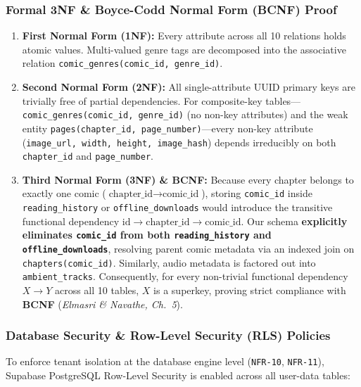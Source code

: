 \subsubsection{Formal 3NF \& Boyce-Codd Normal Form (BCNF) Proof}
\begin{enumerate}
    \item \textbf{First Normal Form (1NF):} Every attribute across all 10 relations holds atomic values. Multi-valued genre tags are decomposed into the associative relation \texttt{comic\_genres(comic\_id, genre\_id)}.
    \item \textbf{Second Normal Form (2NF):} All single-attribute UUID primary keys are trivially free of partial dependencies. For composite-key tables---\texttt{comic\_genres(comic\_id, genre\_id)} (no non-key attributes) and the weak entity \texttt{pages(chapter\_id, page\_number)}---every non-key attribute (\texttt{image\_url, width, height, image\_hash}) depends irreducibly on both \texttt{chapter\_id} and \texttt{page\_number}.
    \item \textbf{Third Normal Form (3NF) \& BCNF:} Because every chapter belongs to exactly one comic ($\text{chapter\_id} \to \text{comic\_id}$), storing \texttt{comic\_id} inside \texttt{reading\_history} or \texttt{offline\_downloads} would introduce the transitive functional dependency $\text{id} \to \text{chapter\_id} \to \text{comic\_id}$. Our schema \textbf{explicitly eliminates \texttt{comic\_id} from both \texttt{reading\_history} and \texttt{offline\_downloads}}, resolving parent comic metadata via an indexed join on \texttt{chapters(comic\_id)}. Similarly, audio metadata is factored out into \texttt{ambient\_tracks}. Consequently, for every non-trivial functional dependency $X \to Y$ across all 10 tables, $X$ is a superkey, proving strict compliance with \textbf{BCNF} (\textit{Elmasri \& Navathe, Ch.\ 5}).
\end{enumerate}

\subsubsection{Database Security \& Row-Level Security (RLS) Policies}
To enforce tenant isolation at the database engine level (\texttt{NFR-10}, \texttt{NFR-11}), Supabase PostgreSQL Row-Level Security is enabled across all user-data tables:

